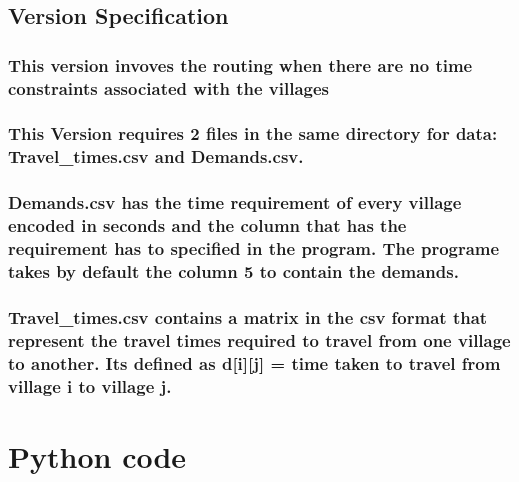 \documentclass[11pt]{article}
\begin{document}
    \subsection{Version Specification}\label{version-specification}

\subsubsection{This version invoves the routing when there are no time
constraints associated with the
villages}\label{this-version-invoves-the-routing-when-there-are-no-time-constraints-associated-with-the-villages}

\subsubsection{This Version requires 2 files in the same directory for
data: Travel\_times.csv and
Demands.csv.}\label{this-version-requires-2-files-in-the-same-directory-for-data-travel_times.csv-and-demands.csv.}

\subsubsection{Demands.csv has the time requirement of every village
encoded in seconds and the column that has the requirement has to
specified in the program. The programe takes by default the column 5 to
contain the
demands.}\label{demands.csv-has-the-time-requirement-of-every-village-encoded-in-seconds-and-the-column-that-has-the-requirement-has-to-specified-in-the-program.-the-programe-takes-by-default-the-column-5-to-contain-the-demands.}

\subsubsection{Travel\_times.csv contains a matrix in the csv format
that represent the travel times required to travel from one village to
another. Its defined as d{[}i{]}{[}j{]} = time taken to travel from
village i to village
j.}\label{travel_times.csv-contains-a-matrix-in-the-csv-format-that-represent-the-travel-times-required-to-travel-from-one-village-to-another.-its-defined-as-dij-time-taken-to-travel-from-village-i-to-village-j.}

    \section{Python code}\label{python-code}
\end{document}
